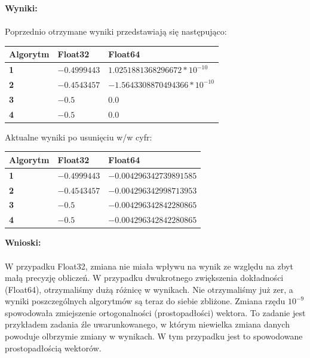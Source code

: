 \documentclass{article}
\begin{document}
\noindent \textbf{Wyniki:} \\\\Poprzednio otrzymane wyniki przedstawiają się następująco:
\begin{center}
	\begin{tabular}{|p{}|p{3cm}|p{5cm}|} \hline
		\textbf{Algorytm} & \textbf{Float32} & \textbf{Float64} \\
		\hline
		\textbf{1} & $-0.4999443$ & $1.0251881368296672*10^{-10}$ \\
		\hline
		\textbf{2} & $-0.4543457$ & $-1.5643308870494366*10^{-10}$ \\
		\hline
		\textbf{3} & $-0.5$ & $0.0$  \\
		\hline
		\textbf{4} & $-0.5$ & $0.0$ \\
		\hline
	\end{tabular}
\end{center}

\noindent Aktualne wyniki po usunięciu w/w cyfr:
\begin{center}
	\begin{tabular}{|p{}|p{3cm}|p{5cm}|} \hline
		\textbf{Algorytm} & \textbf{Float32} & \textbf{Float64} \\
		\hline
		\textbf{1} & $-0.4999443$ & $-0.004296342739891585$ \\
		\hline
		\textbf{2} & $-0.4543457$ & $-0.004296342998713953$ \\
		\hline
		\textbf{3} & $-0.5$ & $-0.004296342842280865$ \\
		\hline
		\textbf{4} & $-0.5$ & $-0.004296342842280865$ \\
		\hline
	\end{tabular}
\end{center}

\noindent \textbf{Wnioski:} \\\\
W przypadku Float32, zmiana nie miała wpływu na wynik ze względu na zbyt małą precyzję obliczeń. W przypadku dwukrotnego zwiększenia dokładności (Float64), otrzymaliśmy dużą różnicę w wynikach. Nie otrzymaliśmy już zer, a wyniki poszczególnych algorytmów są teraz do siebie zbliżone. Zmiana rzędu $10^{-9}$ spowodowała zmiejszenie ortogonalności (prostopadłości) wektora. To zadanie jest przykładem zadania źle uwarunkowanego, w którym niewielka zmiana danych powoduje olbrzymie zmiany w wynikach. W tym przypadku jest to spowodowane prostopadłością wektorów.
\end{document}

